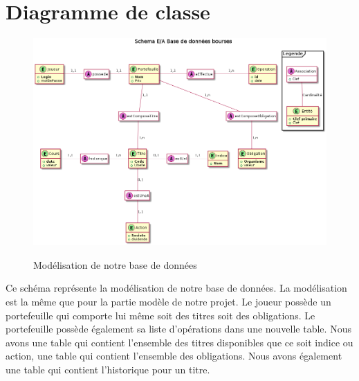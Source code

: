 \section{Diagramme de classe}

\begin{figure}[H]
  \center
  \includegraphics[scale=0.25]{../graph/DiagrammeEntiteAssociation.png} \\
  \caption{Modélisation de notre base de données}
\end{figure}

Ce schéma représente la modélisation de notre base de données. La modélisation est la même que pour la partie modèle de notre projet. Le joueur possède un portefeuille qui comporte lui même soit des titres soit des obligations. Le portefeuille possède également sa liste d'opérations dans une nouvelle table. Nous avons une table qui contient l'ensemble des titres disponibles que ce soit indice ou action, une table qui contient l'ensemble des obligations. Nous avons également une table qui contient l'historique pour un titre. 